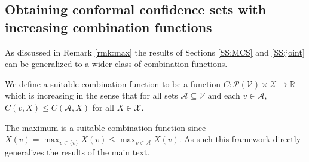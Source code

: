 \subsection{Obtaining conformal confidence sets with increasing combination functions}\label{A:CF}
As discussed in Remark \ref{rmk:max} the results of Sections \ref{SS:MCS} and \ref{SS:joint} can be generalized to a wider class of combination functions. 
\begin{definition}
	We define a suitable combination function to be a function $C: \mathcal{P}(\mathcal{V}) \times \mathcal{X} \rightarrow \mathbb{R}$  which is increasing in the sense that for all sets $\mathcal{A} \subseteq \mathcal{V}$ and each $v \in \mathcal{A} $, $C(v, X) \leq C(\mathcal{A}, X)$ for all $X \in \mathcal{X}$. 
\end{definition}
The maximum is a suitable combination function since $X(v) = \max_{v \in \lbrace v \rbrace } X(v) \leq \max_{v \in \mathcal{A}} X(v)$. As such this framework directly generalizes the results of the main text. 

